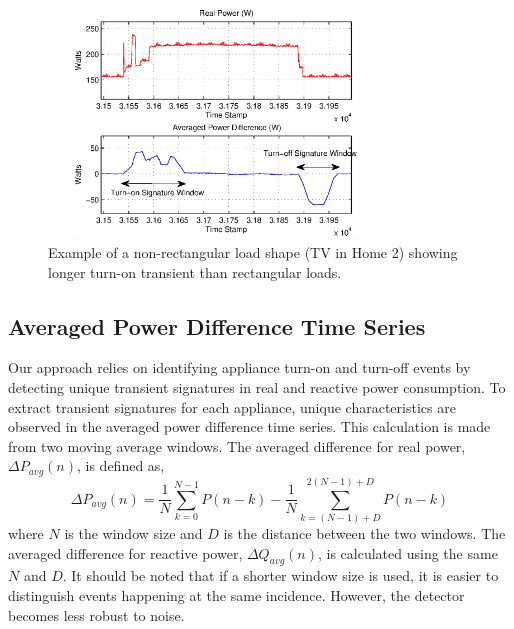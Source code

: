\documentclass[conference]{IEEEtran}
\begin{document}
\begin{figure}[!t]
	\centering
	\includegraphics[height = 2.4in,width=3.5in]{fig/nonrec.eps}
	\caption{Example of a non-rectangular load shape (TV in Home 2) showing longer turn-on transient than rectangular loads.}
	\label{fig:nonrec}
\end{figure}


\subsection{Averaged Power Difference Time Series}
Our approach relies on identifying appliance turn-on and turn-off events by detecting unique transient signatures in real and reactive power consumption. To extract transient signatures for each appliance, unique characteristics are observed in the averaged power difference time series. This calculation is made from two moving average windows.  The averaged difference for real power, $\Delta P_{avg}(n)$, is defined as,
\begin{equation}
\Delta P_{avg}(n) = \frac{1}{N}\sum_{k=0}^{N-1}P(n-k) - \frac{1}{N}\sum_{k=(N-1)+D}^{2(N-1)+D}P(n-k)
\end{equation}
where $N$ is the window size and $D$ is the distance between the two windows.  The averaged difference for reactive power, $\Delta Q_{avg}(n)$, is calculated using the same $N$ and $D$.  It should be noted that if a shorter window size is used, it is easier to distinguish events happening at the same incidence.  However, the detector becomes less robust to noise.
\end{document}
